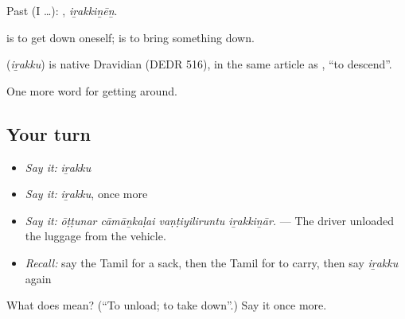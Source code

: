 Past (I …): , \emph{iṟakkiṉēṉ}.

 is to get down oneself;  is to bring something down.

\begin{cousinweb}
\textbf{} (\emph{iṟakku}) is native Dravidian (DEDR 516), in the same article as , \textquotedblleft{}to descend\textquotedblright{}.
\end{cousinweb}

\begin{grammarlens}[title={What you've built}]
One more word for getting around.
\end{grammarlens}

\subsection*{Your turn}
\begin{itemize}
\raggedright
  \item \emph{Say it:} \emph{iṟakku}
  \item \emph{Say it:} \emph{iṟakku}, once more
  \item \emph{Say it:} \emph{ōṭṭunar cāmāṉkaḷai vaṇṭiyiliruntu iṟakkiṉār.} — The driver unloaded the luggage from the vehicle.
  \item \emph{Recall:} say the Tamil for a sack, then the Tamil for to carry, then say \emph{iṟakku} again
\end{itemize}

\begin{tcolorbox}[breakable,colback=teal!4,colframe=teal!35!black,title={Before you move on}]
What does  mean? (\textquotedblleft{}To unload; to take down\textquotedblright{}.) Say it once more.
\end{tcolorbox}
